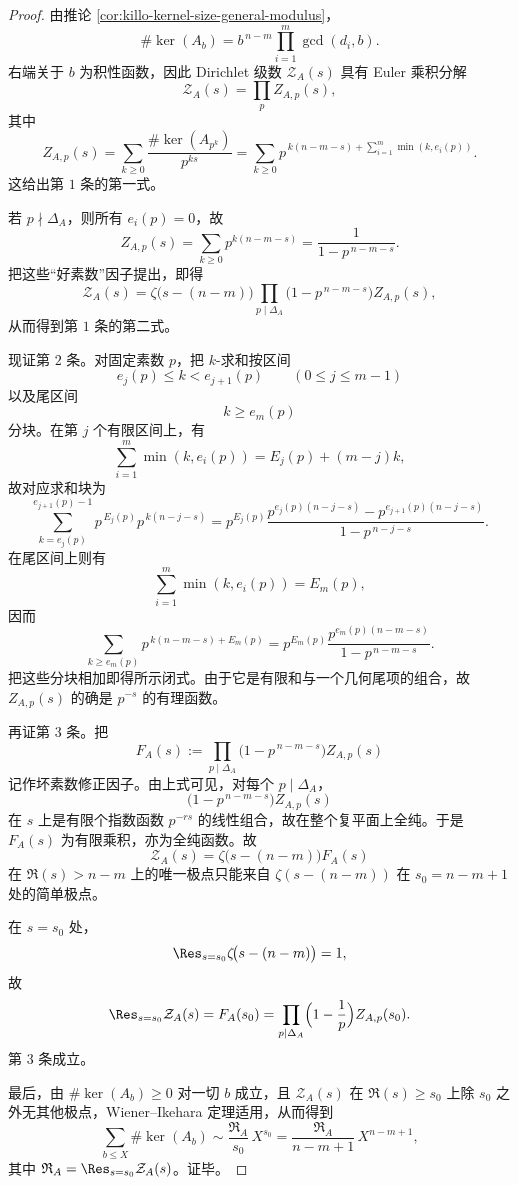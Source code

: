 \begin{proof}
由推论 \ref{cor:killo-kernel-size-general-modulus}，
\[
\#\ker(A_b)=b^{\,n-m}\prod_{i=1}^{m}\gcd(d_i,b).
\]
右端关于 \(b\) 为积性函数，因此 Dirichlet 级数 \(\mathcal Z_A(s)\) 具有 Euler 乘积分解
\[
\mathcal Z_A(s)=\prod_p Z_{A,p}(s),
\]
其中
\[
Z_{A,p}(s)
=
\sum_{k\ge 0}\frac{\#\ker(A_{p^k})}{p^{ks}}
=
\sum_{k\ge 0}p^{\,k(n-m-s)+\sum_{i=1}^{m}\min(k,e_i(p))}.
\]
这给出第 \(1\) 条的第一式。

若 \(p\nmid \Delta_A\)，则所有 \(e_i(p)=0\)，故
\[
Z_{A,p}(s)=\sum_{k\ge 0}p^{k(n-m-s)}=\frac{1}{1-p^{\,n-m-s}}.
\]
把这些“好素数”因子提出，即得
\[
\mathcal Z_A(s)
=
\zeta\!\bigl(s-(n-m)\bigr)
\prod_{p\mid \Delta_A}\bigl(1-p^{\,n-m-s}\bigr)Z_{A,p}(s),
\]
从而得到第 \(1\) 条的第二式。

现证第 \(2\) 条。对固定素数 \(p\)，把 \(k\)-求和按区间
\[
e_j(p)\le k<e_{j+1}(p)\qquad(0\le j\le m-1)
\]
以及尾区间
\[
k\ge e_m(p)
\]
分块。在第 \(j\) 个有限区间上，有
\[
\sum_{i=1}^{m}\min(k,e_i(p))
=
E_j(p)+(m-j)k,
\]
故对应求和块为
\[
\sum_{k=e_j(p)}^{e_{j+1}(p)-1}p^{\,E_j(p)}p^{\,k(n-j-s)}
=
p^{E_j(p)}
\frac{
p^{e_j(p)(n-j-s)}-p^{e_{j+1}(p)(n-j-s)}
}{
1-p^{\,n-j-s}
}.
\]
在尾区间上则有
\[
\sum_{i=1}^{m}\min(k,e_i(p))=E_m(p),
\]
因而
\[
\sum_{k\ge e_m(p)}p^{\,k(n-m-s)+E_m(p)}
=
p^{E_m(p)}
\frac{
p^{e_m(p)(n-m-s)}
}{
1-p^{\,n-m-s}
}.
\]
把这些分块相加即得所示闭式。由于它是有限和与一个几何尾项的组合，故 \(Z_{A,p}(s)\) 的确是 \(p^{-s}\) 的有理函数。

再证第 \(3\) 条。把
\[
F_A(s):=\prod_{p\mid \Delta_A}\bigl(1-p^{\,n-m-s}\bigr)Z_{A,p}(s)
\]
记作坏素数修正因子。由上式可见，对每个 \(p\mid\Delta_A\)，
\[
\bigl(1-p^{\,n-m-s}\bigr)Z_{A,p}(s)
\]
在 \(s\) 上是有限个指数函数 \(p^{-rs}\) 的线性组合，故在整个复平面上全纯。于是 \(F_A(s)\) 为有限乘积，亦为全纯函数。故
\[
\mathcal Z_A(s)=\zeta\!\bigl(s-(n-m)\bigr)F_A(s)
\]
在 \(\Re(s)>n-m\) 上的唯一极点只能来自 \(\zeta(s-(n-m))\) 在 \(s_0=n-m+1\) 处的简单极点。

在 \(s=s_0\) 处，
\[
\Res_{s=s_0}\zeta\!\bigl(s-(n-m)\bigr)=1,
\]
故
\[
\Res_{s=s_0}\mathcal Z_A(s)=F_A(s_0)
=
\prod_{p\mid \Delta_A}\Bigl(1-\frac1p\Bigr)Z_{A,p}(s_0).
\]
第 \(3\) 条成立。

最后，由 \(\#\ker(A_b)\ge 0\) 对一切 \(b\) 成立，且 \(\mathcal Z_A(s)\) 在 \(\Re(s)\ge s_0\) 上除 \(s_0\) 之外无其他极点，Wiener--Ikehara 定理适用，从而得到
\[
\sum_{b\le X}\#\ker(A_b)
\sim
\frac{\mathfrak R_A}{s_0}\,X^{s_0}
=
\frac{\mathfrak R_A}{n-m+1}\,X^{n-m+1},
\]
其中 \(\mathfrak R_A=\Res_{s=s_0}\mathcal Z_A(s)\)。证毕。
\end{proof}

